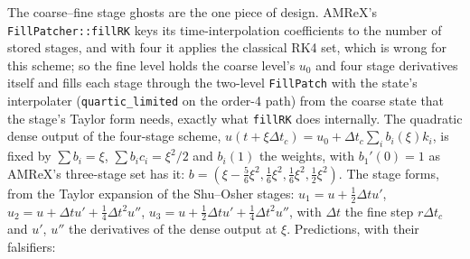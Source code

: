 \documentclass[11pt,a4paper]{article}
\newcommand{\code}[1]{\texttt{\small #1}}
\newcommand{\Dt}{\Delta t}
\begin{document}
The coarse--fine stage ghosts are the one piece of design.  AMReX's
\code{FillPatcher::fillRK} keys its time-interpolation coefficients to
the number of stored stages, and with four it applies the classical RK4
set, which is wrong for this scheme; so the fine level holds the coarse
level's $u_0$ and four stage derivatives itself and fills each stage
through the two-level \code{FillPatch} with the state's interpolater
(\code{quartic\_limited} on the order-4 path) from the coarse state
that the stage's Taylor form needs, exactly what \code{fillRK} does
internally.  The quadratic dense output of the four-stage scheme,
$u(t + \xi\Dt_c) = u_0 + \Dt_c \sum_i b_i(\xi) k_i$, is fixed by
$\sum b_i = \xi$, $\sum b_i c_i = \xi^2/2$ and $b_i(1)$ the weights, with
$b_1'(0) = 1$ as AMReX's three-stage set has it: $b = (\xi - \tfrac56\xi^2,
\tfrac16\xi^2, \tfrac16\xi^2, \tfrac12\xi^2)$.  The stage forms, from the
Taylor expansion of the Shu--Osher stages: $u_1 = u + \tfrac12\Dt u'$,
$u_2 = u + \Dt u' + \tfrac14\Dt^2 u''$, $u_3 = u + \tfrac12\Dt u' +
\tfrac14\Dt^2 u''$, with $\Dt$ the fine step $r\Dt_c$ and $u'$, $u''$
the derivatives of the dense output at $\xi$.  Predictions, with their
falsifiers:
\end{document}
